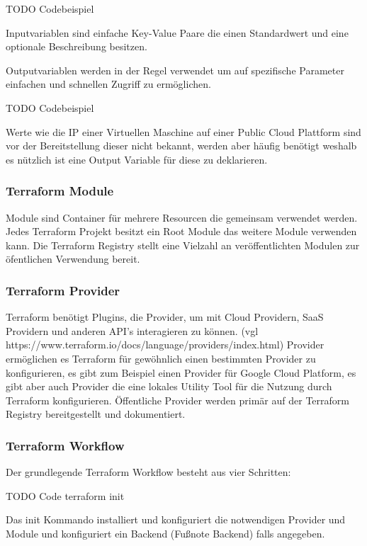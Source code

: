 \begin{spacing}{1.2}
TODO Codebeispiel

Inputvariablen sind einfache Key-Value Paare die einen Standardwert und
eine optionale Beschreibung besitzen.

Outputvariablen werden in der Regel verwendet um auf spezifische Parameter
einfachen und schnellen Zugriff zu ermöglichen.

TODO Codebeispiel

Werte wie die IP einer
Virtuellen Maschine auf einer Public Cloud Plattform sind vor der
Bereitstellung dieser nicht bekannt, werden aber häufig benötigt weshalb es
nützlich ist eine Output Variable für diese zu deklarieren.

\subsubsection{Terraform Module}

Module sind Container für mehrere Resourcen die gemeinsam verwendet werden.
Jedes Terraform Projekt besitzt ein Root Module das weitere Module verwenden
kann. Die Terraform Registry stellt eine Vielzahl an veröffentlichten
Modulen zur öfentlichen Verwendung bereit.

\subsubsection{Terraform Provider}

Terraform benötigt Plugins, die Provider, um mit Cloud Providern,
SaaS Providern und anderen API's interagieren zu können. (vgl https://www.terraform.io/docs/language/providers/index.html)
Provider ermöglichen es Terraform für gewöhnlich einen bestimmten Provider zu
konfigurieren, es gibt zum Beispiel einen Provider für Google Cloud
Platform, es gibt aber auch Provider die eine lokales Utility Tool für die
Nutzung durch Terraform konfigurieren. Öffentliche Provider werden primär
auf der Terraform Registry bereitgestellt und dokumentiert.

\subsubsection{Terraform Workflow}

Der grundlegende Terraform Workflow besteht aus vier Schritten:

TODO Code terraform init

Das init Kommando installiert und konfiguriert die notwendigen Provider
und Module und konfiguriert ein Backend (Fußnote Backend) falls angegeben.


\end{spacing}
